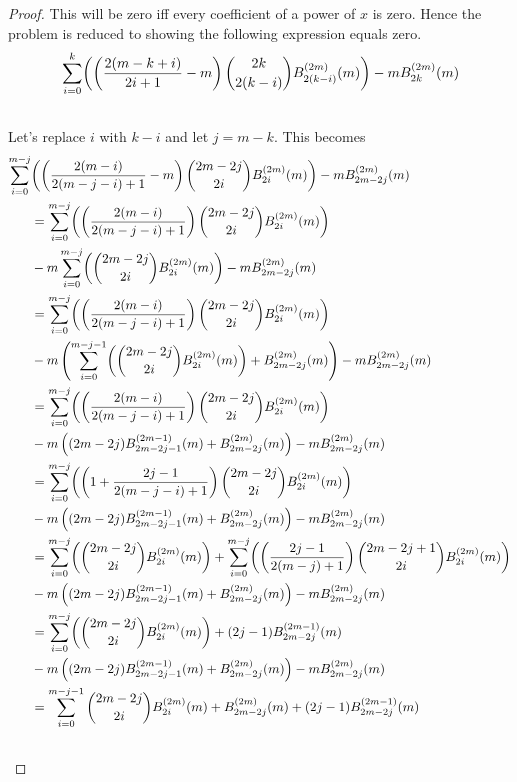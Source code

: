 \documentclass[fleqn,a4paper,9pt]{article}
\begin{document}
\begin{flushleft}
\begin{proof}
This will be zero iff every coefficient of a power of $x$ is zero. Hence the problem is reduced to showing the following expression equals zero.
\begin{align}\notag
&\sum_{i=0}^{k}\biggl(\left(\frac{2(m-k+i)}{2i+1}-m\right)\binom{2k}{2(k-i)}B_{2(k-i)}^{(2m)}(m)\biggr)
-mB_{2k}^{(2m)}(m)\\\notag
\end{align}
Let's replace $i$ with $k-i$ and let $j=m-k$. This becomes
\begin{align}\notag
 \sum_{i=0}^{m-j}&\biggl(\left(\frac{2(m-i)}{2(m-j-i)+1}-m\right)\binom{2m-2j}{2i}B_{2i}^{(2m)}(m)\biggr)-m B_{2m-2j}^{(2m)}(m)\\\notag
 &=\sum_{i=0}^{m-j}\biggl(\left(\frac{2(m-i)}{2(m-j-i)+1}\right)\binom{2m-2j}{2i}B_{2i}^{(2m)}(m)\biggr)\\\notag
&-m \sum_{i=0}^{m-j}\biggl(\binom{2m-2j}{2i}B_{2i}^{(2m)}(m)\biggr)-m B_{2m-2j}^{(2m)}(m)\\\notag
 &=\sum_{i=0}^{m-j}\biggl(\left(\frac{2(m-i)}{2(m-j-i)+1}\right)\binom{2m-2j}{2i}B_{2i}^{(2m)}(m)\biggr)\\\notag
&-m \left(\sum_{i=0}^{m-j-1}\biggl(\binom{2m-2j}{2i}B_{2i}^{(2m)}(m)\biggr)+B_{2m-2j}^{(2m)}(m)\right)-m B_{2m-2j}^{(2m)}(m)\\\notag
 &=\sum_{i=0}^{m-j}\biggl(\left(\frac{2(m-i)}{2(m-j-i)+1}\right)\binom{2m-2j}{2i}B_{2i}^{(2m)}(m)\biggr)\\\notag
&-m \left((2m-2j)B_{2m-2j-1}^{(2m-1)}(m)+B_{2m-2j}^{(2m)}(m)\right)-m B_{2m-2j}^{(2m)}(m)\\\notag
&=\sum_{i=0}^{m-j}\biggl(\left(1+\frac{2j-1}{2(m-j-i)+1}\right)\binom{2m-2j}{2i}B_{2i}^{(2m)}(m)\biggr)\\\notag
&-m \left((2m-2j)B_{2m-2j-1}^{(2m-1)}(m)+B_{2m-2j}^{(2m)}(m)\right)-m B_{2m-2j}^{(2m)}(m)\\\notag
&=\sum_{i=0}^{m-j}\biggl(\binom{2m-2j}{2i}B_{2i}^{(2m)}(m)\biggr)+\sum_{i=0}^{m-j}\biggl(\left(\frac{2j-1}{2(m-j)+1}\right)\binom{2m-2j+1}{2i}B_{2i}^{(2m)}(m)\biggr)\\\notag
&-m \left((2m-2j)B_{2m-2j-1}^{(2m-1)}(m)+B_{2m-2j}^{(2m)}(m)\right)-m B_{2m-2j}^{(2m)}(m)\\\notag
&=\sum_{i=0}^{m-j}\biggl(\binom{2m-2j}{2i}B_{2i}^{(2m)}(m)\biggr)+(2j-1)B_{2m-2j}^{(2m-1)}(m)\\\notag
&-m \left((2m-2j)B_{2m-2j-1}^{(2m-1)}(m)+B_{2m-2j}^{(2m)}(m)\right)-m B_{2m-2j}^{(2m)}(m)\\\notag
&=\sum_{i=0}^{m-j-1}\binom{2m-2j}{2i}B_{2i}^{(2m)}(m)+B_{2m-2j}^{(2m)}(m)+(2j-1)B_{2m-2j}^{(2m-1)}(m)\\\notag

\end{align}
\end{proof}
\end{flushleft}
\end{document}
